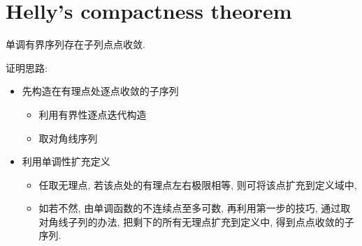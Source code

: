 \section{Helly's compactness theorem}
\begin{theorem}
	单调有界序列存在子列点点收敛.
\end{theorem}
证明思路:
\begin{itemize}
	\item 先构造在有理点处逐点收敛的子序列
	\begin{itemize}
		\item 利用有界性逐点迭代构造
		\item 取对角线序列
	\end{itemize}
	\item 利用单调性扩充定义
	\begin{itemize}
		\item 任取无理点, 若该点处的有理点左右极限相等, 则可将该点扩充到定义域中,
		\item 如若不然, 由单调函数的不连续点至多可数, 
		再利用第一步的技巧, 通过取对角线子列的办法, 
		把剩下的所有无理点扩充到定义中, 得到点点收敛的子序列.
	\end{itemize}
\end{itemize}

